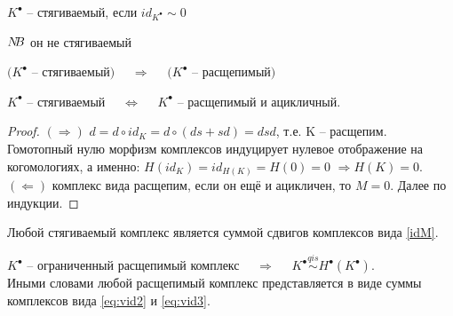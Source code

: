 \documentclass[../main.tex]{subfiles}
\begin{document}
\begin{to_def}
$K^\bullet$ -- стягиваемый, если $id_{K^\bullet}\sim 0$
\end{to_def}
\begin{to_ex}\label{idM}
\bee
\label{eq:vid2}
\eee
\end{to_ex}
\begin{to_ex}
\bee
\label{eq:vid3}
\eee
$N\kern-0.3em B$ он не стягиваемый
\end{to_ex}
\begin{to_suj}
$(K^\bullet$ -- стягиваемый$)$ $\quad \Rightarrow \quad$ $(K^\bullet$ -- расщепимый$)$
\bee
{}
\eee
\end{to_suj}
\begin{to_suj}
$K^\bullet$ -- стягиваемый $\quad \Leftrightarrow \quad$ $K^\bullet$ -- расщепимый и ацикличный.
\end{to_suj}
\begin{proof}
$(\Rightarrow)$ $d = d\circ id_K = d\circ(ds + sd) = dsd$, т.е. K -- расщепим. Гомотопный нулю морфизм комплексов индуцирует нулевое отображение на когомологиях, а именно: $H(id_K) = id_{H(K)} = H(0) = 0$ $\Rightarrow H(K)=0$. $(\Leftarrow)$ комплекс вида \label{eq:vid3} расщепим, если он ещё и ацикличен, то $M = 0$. Далее по индукции.
\end{proof}
\begin{to_suj}
Любой стягиваемый комплекс является суммой сдвигов комплексов вида \ref{idM}. 
\end{to_suj}
\begin{to_suj}\label{split1}
$K^\bullet$ -- ограниченный расщепимый комплекс $\quad \Rightarrow \quad$ $K^\bullet\overset{qis}{\sim}H^\bullet(K^\bullet)$. \\
Иными словами любой расщепимый комплекс представляется в виде суммы комплексов вида \ref{eq:vid2} и \ref{eq:vid3}.
\end{to_suj}
\end{document}
